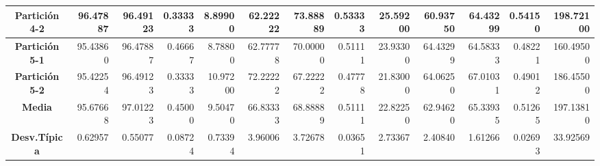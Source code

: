 \documentclass[a4paper,11pt]{article}
\begin{document}
\begin{table}[H]
\begin{adjustbox}{width=1.1\textwidth}
\begin{tabular}{|c|r|r|r|r|r|r|r|r|r|r|r|r|}
  \textbf{Partición 4-2} & 96.47887 & 96.49123 & 0.33333 & 8.89900 & 62.22222 & 73.88889 & 0.53333 & 25.59200 & 60.93750 & 64.43299 & 0.54150 & 198.72100 \\ \hline
  \textbf{Partición 5-1} & 95.43860 & 96.47887 & 0.46667 & 8.78800 & 62.77778 & 70.00000 & 0.51111 & 23.93300 & 64.43299 & 64.58333 & 0.48221 & 160.49500 \\ \hline
  \textbf{Partición 5-2} & 95.42254 & 96.49123 & 0.33333 & 10.97200 & 72.22222 & 67.22222 & 0.47778 & 21.83000 & 64.06250 & 67.01031 & 0.49012 & 186.45500 \\ \hline
  \textbf{Media} & 95.67668 & 97.01223 & 0.45000 & 9.50470 & 66.83333 & 68.88889 & 0.51111 & 22.82250 & 62.94620 & 65.33935 & 0.51265 & 197.13810 \\ \hline
  \textbf{Desv.Típica} & 0.62957 & 0.55077 & 0.08724 & 0.73394 & 3.96006 & 3.72678 & 0.03651 & 2.73367 & 2.40840 & 1.61266 & 0.02693 & 33.92569 \\ \hline
  \end{tabular}
  \end{adjustbox}
  \label{AM3}
  \end{table}
  
\end{document}
